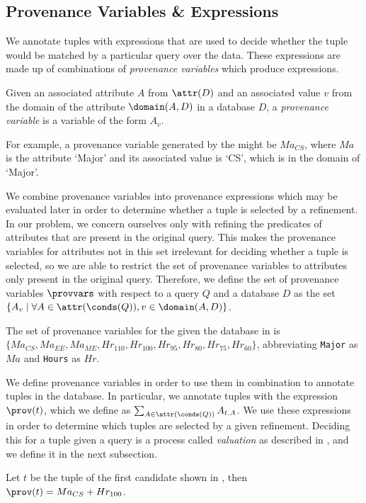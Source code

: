 \subsection{Provenance Variables \& Expressions}
We annotate tuples with expressions that are used to decide whether the tuple would be matched by a particular query over the data. These expressions are made up of combinations of {\it provenance variables} which produce expressions. 
\begin{definition}
    Given an associated attribute $A$ from $\attr(D)$ and an associated value $v$ from the domain of the attribute $\domain(A, D)$ in a database $D$, a {\it provenance variable} is a variable of the form $A_v$.
\end{definition}
\begin{example}
    For example, a provenance variable generated by the \running{} might be $Ma_{CS}$, where $Ma$ is the attribute `Major' and its associated value is `CS', which is in the domain of `Major'. 
\end{example}
We combine provenance variables into provenance expressions which may be evaluated later in order to determine whether a tuple is selected by a refinement. In our problem, we concern ourselves only with refining the predicates of attributes that are present in the original query. This makes the provenance variables for attributes not in this set irrelevant for deciding whether a tuple is selected, so we are able to restrict the set of provenance variables to attributes only present in the original query. Therefore, we define the set of provenance variables $\provvars$ with respect to a query $Q$ and a database $D$ as the set $\{ A_v \mid \forall A \in \attr(\conds(Q)), v \in \domain(A, D) \}$.
\begin{example}
    The set of provenance variables for the \running{} given the database in  is $\{Ma_{CS}, Ma_{EE},\allowbreak Ma_{ME}, Hr_{110}, Hr_{100}, Hr_{95}, Hr_{80}, Hr_{75}, Hr_{60}\}$, abbreviating {\tt Major} as $Ma$ and {\tt Hours} as $Hr$.
\end{example}

We define provenance variables in order to use them in combination to annotate tuples in the database. In particular, we annotate tuples with the expression $\prov(t)$, which we define as $\sum_{A \in \attr(\conds(Q))} A_{t.A}$. We use these expressions in order to determine which tuples are selected by a given refinement. Deciding this for a tuple given a query is a process called {\it valuation} as described in \cite{MLJ22}, and we define it in the next subsection.
 \begin{example}
 \label{ex:provexpr}
    Let $t$ be the tuple of the first candidate shown in , then $\prov(t) = Ma_{CS} + Hr_{100}$.
\end{example}

